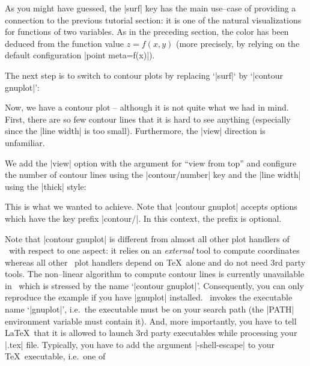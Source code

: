 As you might have guessed, the |surf| key has the main use--case of providing a connection to the previous tutorial section: it is one of the natural visualizations for functions of two variables. As in the preceding section, the color has been deduced from the function value $z=f(x,y)$ (more precisely, by relying on the default configuration |point meta=f(x)|).

The next step is to switch to contour plots by replacing `|surf|` by `|contour gnuplot|':

\pgfplotsexpensiveexample
\begin{codeexample}[]
\end{codeexample}
Now, we have a contour plot -- although it is not quite what we had in mind. First, there are so few contour lines that it is hard to see anything (especially since the |line width| is too small). Furthermore, the |view| direction is unfamiliar.

We add the |view| option with the argument for ``view from top'' and configure the number of contour lines using the |contour/number| key and the |line width| using the |thick| style:

\pgfplotsexpensiveexample
\begin{codeexample}[]
\end{codeexample}

This is what we wanted to achieve. Note that |contour gnuplot| accepts options which have the key prefix |contour/|. In this context, the prefix is optional.

Note that |contour gnuplot| is different from almost all other plot handlers of \PGFPlots\ with respect to one aspect: it relies on an \emph{external} tool to compute coordinates whereas all other \PGFPlots\ plot handlers depend on \TeX\ alone and do not need 3rd party tools. The non--linear algorithm to compute contour lines is currently unavailable in \PGFPlots\ which is stressed by the name `|contour gnuplot|'. Consequently, you can only reproduce the example if you have |gnuplot| installed. \PGFPlots\ invokes the executable name `|gnuplot|', i.e.\ the executable must be on your search path (the |PATH| environment variable must contain it). And, more importantly, you have to tell \LaTeX\ that it is allowed to launch 3rd party executables while processing your |.tex| file. Typically, you have to add the argument |-shell-escape| to your \TeX\ executable, i.e.\ one of  

